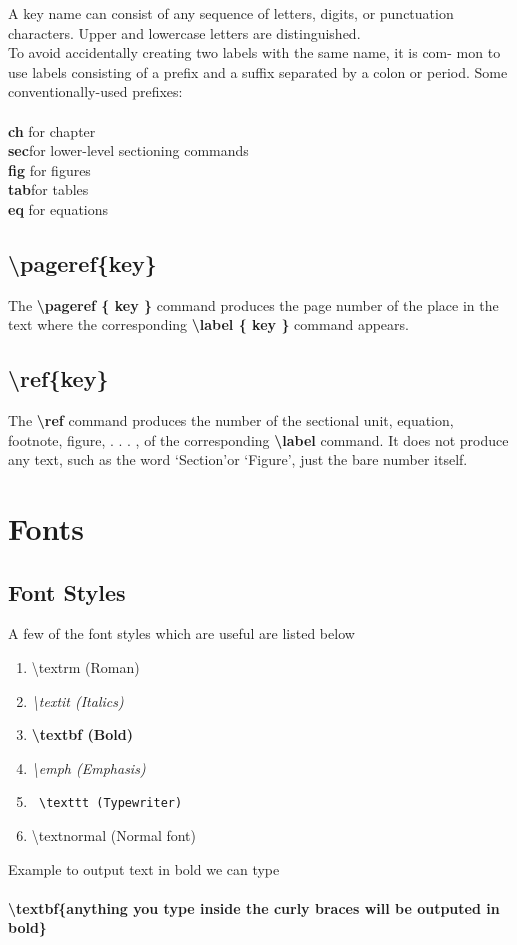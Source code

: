 \documentclass[12pt]{article}
\begin{document}
{A key name can consist of any sequence of letters, digits, or punctuation
characters. Upper and lowercase letters are distinguished.\\


To avoid accidentally creating two labels with the same name, it is com-
mon to use labels consisting of a prefix and a suffix separated by a colon or
period. Some conventionally-used prefixes:\\\\
\textbf{ch}  \indent for chapter\\
\textbf{sec}\indent for lower-level sectioning commands\\
\textbf{fig} \indent for figures\\
\textbf{tab}\indent for tables\\
\textbf{eq}   \indent for equations\\


\subsection{\textbackslash pageref\{key\} }
The \textbf{\textbackslash pageref \{ key \} } command produces the page number of the place in
the text where the corresponding \textbf{\textbackslash label \{ key \} } command appears.


\subsection{\textbackslash ref\{key\} }
The \textbf{\textbackslash ref } command produces the number of the sectional unit, equation,
footnote, figure, . . . , of the corresponding \textbf{\textbackslash label} command. It does not
produce any text, such as the word \textquoteleft Section\textquoteright or \textquoteleft Figure\textquoteright, just the bare number
itself.


\section{Fonts}

\subsection{Font Styles}
A few of the font styles which are useful are listed below
\begin{enumerate} 
\item \textrm{\textbackslash textrm (Roman)}
\item \textit{\textbackslash textit (Italics)}
\item \textbf{\textbackslash textbf (Bold)}
\item \emph{\textbackslash emph (Emphasis)}
\item \texttt{ \textbackslash texttt (Typewriter)}
\item \textnormal{ \textbackslash textnormal (Normal font)}
\end{enumerate}
Example to output text in bold we can type\\\\ 
\textbf{\textbackslash textbf\{anything you type inside the curly braces will be outputed
in bold\} }\\
}
\end{document}
